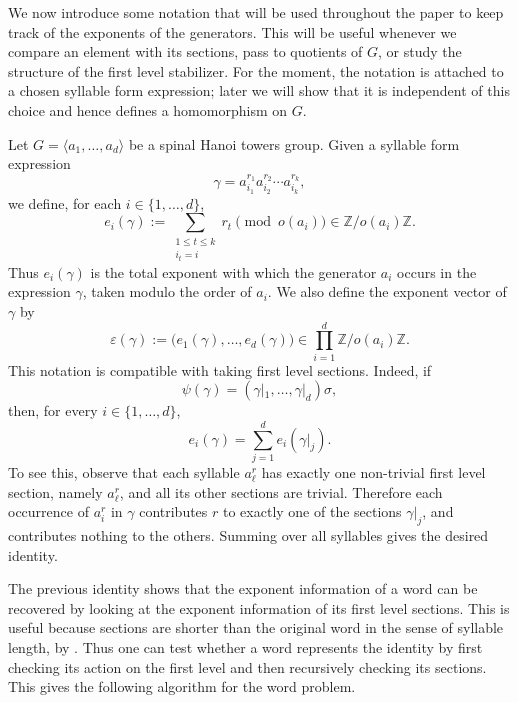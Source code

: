 \documentclass[11pt,leqno]{amsart}
\theoremstyle{plain}
\numberwithin{equation}{section}
\begin{document}
We now introduce some notation that will be used throughout the paper to keep track of
the exponents of the generators. This will be useful whenever we compare an element with
its sections, pass to quotients of $G$, or study the structure of the first level stabilizer.
For the moment, the notation is attached to a chosen syllable form expression; later we will
show that it is independent of this choice and hence defines a homomorphism on $G$.

Let $G=\langle a_1,\ldots,a_d\rangle$ be a spinal Hanoi towers group.
Given a syllable form expression
\[
\gamma  =  a_{i_1}^{r_1} a_{i_2}^{r_2}\cdots a_{i_k}^{r_k},
\]
we define, for each $i\in \{1,\ldots,d\}$,
\[
e_i(\gamma)
:=
\sum_{\substack{1\le t\le k\\ i_t=i}} r_t
\pmod {o(a_i)}
\in \mathbb Z/o(a_i)\mathbb Z.
\]
Thus $e_i(\gamma)$ is the total exponent with which the generator $a_i$ occurs in
the expression $\gamma$, taken modulo the order of $a_i$. We also define the exponent
vector of $\gamma$ by
\[
\varepsilon(\gamma)
:=
\bigl(e_1(\gamma),\ldots,e_d(\gamma)\bigr)
\in
\prod_{i=1}^d \mathbb Z/o(a_i)\mathbb Z.
\]
This notation is compatible with taking first level sections. Indeed, if
\[
\psi(\gamma)=(\gamma|_1,\ldots,\gamma|_d)\sigma,
\]
then, for every $i\in \{1,\ldots,d\}$,
\begin{equation}\label{Observation: sum of exponets over sections}
    e_i(\gamma)=\sum_{j=1}^d e_i(\gamma|_j).
\end{equation}
To see this, observe that each syllable $a_\ell^r$ has exactly one non-trivial first level section, namely $a_\ell^r$, and all its other sections are trivial. Therefore each occurrence of $a_i^r$ in $\gamma$ contributes $r$ to exactly one of the sections $\gamma|_j$, and contributes nothing to the others. Summing over all syllables gives the desired identity.

The previous identity shows that the exponent information of a word can be recovered by looking at the exponent information of its first level sections. This is useful because sections are shorter than the original word in the sense of syllable length, by
. Thus one can test whether a word represents the identity by first checking its action on the first level and then recursively checking its sections. This gives the following algorithm for the word problem. 
\end{document}
